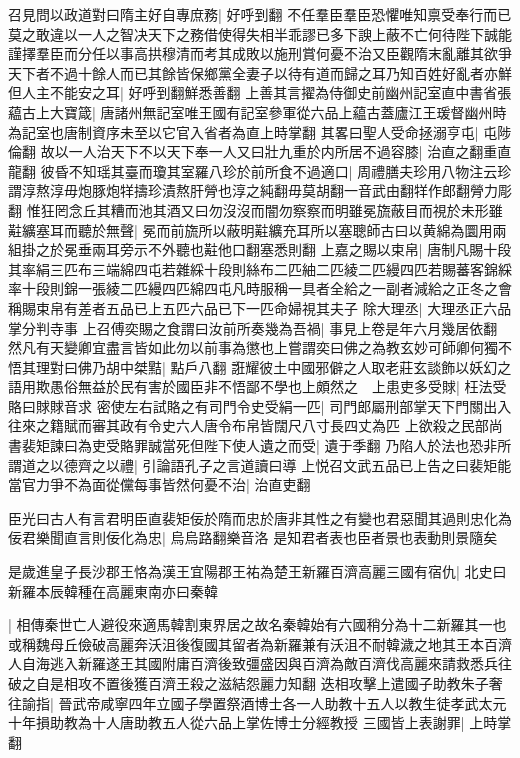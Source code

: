 召見問以政道對曰隋主好自專庶務|{
	好呼到翻}
不任羣臣羣臣恐懼唯知禀受奉行而已莫之敢違以一人之智决天下之務借使得失相半乖謬已多下諛上蔽不亡何待陛下誠能謹擇羣臣而分任以事高拱穆清而考其成敗以施刑賞何憂不治又臣觀隋末亂離其欲爭天下者不過十餘人而已其餘皆保鄉黨全妻子以待有道而歸之耳乃知百姓好亂者亦鮮但人主不能安之耳|{
	好呼到翻鮮悉善翻}
上善其言擢為侍御史前幽州記室直中書省張藴古上大寶箴|{
	唐諸州無記室唯王國有記室參軍從六品上藴古蓋廬江王瑗督幽州時為記室也唐制資序未至以它官入省者為直上時掌翻}
其畧曰聖人受命拯溺亨屯|{
	屯陟倫翻}
故以一人治天下不以天下奉一人又曰壯九重於内所居不過容膝|{
	治直之翻重直龍翻}
彼昏不知瑶其臺而瓊其室羅八珍於前所食不過適口|{
	周禮膳夫珍用八物注云珍謂淳熬淳毋炮豚炮䍧擣珍漬熬肝膋也淳之純翻毋莫胡翻一音武由翻䍧作郎翻膋力彫翻}
惟狂罔念丘其糟而池其酒又曰勿沒沒而闇勿察察而明雖冕旒蔽目而視於未形雖黈纊塞耳而聽於無聲|{
	冕而前旒所以蔽明黈纊充耳所以塞聰師古曰以黄綿為圜用兩組掛之於冕垂兩耳旁示不外聽也黈他口翻塞悉則翻}
上嘉之賜以束帛|{
	唐制凡賜十段其率絹三匹布三端綿四屯若雜綵十段則絲布二匹紬二匹綾二匹縵四匹若賜蕃客錦綵率十段則錦一張綾二匹縵四匹綿四屯凡時服稱一具者全給之一副者減給之正冬之會稱賜束帛有差者五品已上五匹六品已下一匹命婦視其夫子}
除大理丞|{
	大理丞正六品掌分判寺事}
上召傅奕賜之食謂曰汝前所奏幾為吾禍|{
	事見上卷是年六月幾居依翻}
然凡有天變卿宜盡言皆如此勿以前事為懲也上嘗謂奕曰佛之為教玄妙可師卿何獨不悟其理對曰佛乃胡中桀黠|{
	點戶八翻}
誑耀彼土中國邪僻之人取老莊玄談飾以妖幻之語用欺愚俗無益於民有害於國臣非不悟鄙不學也上頗然之　上患吏多受賕|{
	枉法受賂曰賕賕音求}
密使左右試賂之有司門令史受絹一匹|{
	司門郎屬刑部掌天下門關出入往來之籍賦而審其政有令史六人唐令布帛皆闊尺八寸長四丈為匹}
上欲殺之民部尚書裴矩諫曰為吏受賂罪誠當死但陛下使人遺之而受|{
	遺于季翻}
乃陷人於法也恐非所謂道之以德齊之以禮|{
	引論語孔子之言道讀曰導}
上悦召文武五品已上告之曰裴矩能當官力爭不為面從儻每事皆然何憂不治|{
	治直吏翻}


臣光曰古人有言君明臣直裴矩佞於隋而忠於唐非其性之有變也君惡聞其過則忠化為佞君樂聞直言則佞化為忠|{
	烏烏路翻樂音洛}
是知君者表也臣者景也表動則景隨矣

是歲進皇子長沙郡王恪為漢王宜陽郡王祐為楚王新羅百濟高麗三國有宿仇|{
	北史曰新羅本辰韓種在高麗東南亦曰秦韓}


|{
	相傳秦世亡人避役來適馬韓割東界居之故名秦韓始有六國稍分為十二新羅其一也或稱魏母丘儉破高麗奔沃沮後復國其留者為新羅兼有沃沮不耐韓濊之地其王本百濟人自海逃入新羅遂王其國附庸百濟後致彊盛因與百濟為敵百濟伐高麗來請救悉兵往破之自是相攻不置後獲百濟王殺之滋結怨麗力知翻}
迭相攻擊上遣國子助教朱子奢往諭指|{
	晉武帝咸寧四年立國子學置祭酒博士各一人助教十五人以教生徒孝武太元十年損助教為十人唐助教五人從六品上掌佐博士分經教授}
三國皆上表謝罪|{
	上時掌翻}


